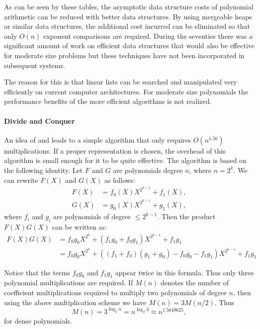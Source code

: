 As can be seen by these tables, the asymptotic data structure costs of
polynomial arithmetic can be reduced with better data structures.  By
using mergeable heaps or similar data structures, the additional cost
incurred can be eliminated so that only $O(n)$ exponent comparisons
are required.  During the seventies there was a significant amount of
work on efficient data structures that would also be effective for
moderate size problems \cite{Horowitz75,Klip79} but these techniques
have not been incorporated in subsequent systems.

The reason for this is that linear lists can be searched and
manipulated very efficiently on current computer architectures.  For
moderate size polynomials the performance benefits of the more
efficient algorithms is not realized.

\paragraph{Divide and Conquer}

An idea of {\Karatsuba} and {\Ofman} \cite{Karatsuba63} leads to a
simple algorithm that only requires $O(n^{1.56})$ multiplications.  If
a proper representation is chosen, the overhead of this algorithm is
small enough for it to be quite effective.  The algorithm is based on
the following identity.  Let $F$ and $G$ are polynomials degree $n$,
where $n = 2^k$.  We can rewrite $F(X)$ and $G(X)$ as follows:
\[
\begin{aligned}
F(X)&= f_0(X) X^{2^{k-1}} + f_1(X),\\
G(X)&= g_0(X) X^{2^{k-1}} + g_1(X),
\end{aligned}
\]
where $f_i$ and $g_i$ are polynomials of degree $\le 2^{k-1}$.  Then
the product $F(X) G(X)$ can be written as:
\[
\begin{aligned}
  F(X) G(X) &= f_0 g_0 X^{2^k} + (f_1 g_0 + f_0 g_1) X^{2^{k-1}} + f_1 g_1\\
    &= f_0 g_0 X^{2^k} 
       + ((f_1 + f_0) (g_1 + g_0) - f_0 g_0 - f_1 g_1) X^{2^{k-1}}
       + f_1 g_1
\end{aligned}
\]

Notice that the terms $f_0 g_0$ and $f_1 g_1$ appear twice in this formula.
Thus only three polynomial multiplications are required.  If $M(n)$ denotes
the number of coefficient multiplications required to multiply two
polynomials of degree $n$, then using the above multiplication scheme we
have $M(n) = 3 M(n/2)$.  Thus
\[
M(n) = 3 ^{\log_2 n} = n^{\log_2 3} \approx n^{1.5649625},
\]
for dense polynomials.  

